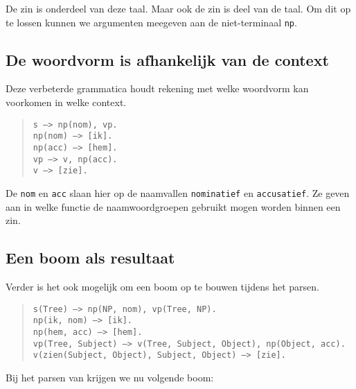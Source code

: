 De zin  is onderdeel van deze taal. Maar ook de zin  is deel van de taal. Om dit op te lossen kunnen we argumenten meegeven aan de niet-terminaal \texttt{np}.

\subsection{De woordvorm is afhankelijk van de context}
\begin{ex}
  \label{ex:nom-acc-features}
  Deze verbeterde grammatica houdt rekening met welke woordvorm kan voorkomen in welke context.
  \begin{quote}
    \texttt{s ---> np(nom), vp.} \\
    \texttt{np(nom) ---> [ik].} \\
    \texttt{np(acc) ---> [hem].} \\
    \texttt{vp ---> v, np(acc).} \\
    \texttt{v ---> [zie].} \\
  \end{quote}
\end{ex} 

De \texttt{nom} en \texttt{acc} slaan hier op de naamvallen \texttt{nominatief} en \texttt{accusatief}. Ze geven aan in welke functie de naamwoordgroepen gebruikt mogen worden binnen een zin.

\subsection{Een boom als resultaat}
\begin{ex} Verder is het ook mogelijk om een boom op te bouwen tijdens het parsen.
  \begin{quote}
    \texttt{s(Tree) ---> np(NP, nom), vp(Tree, NP).} \\
    \texttt{np(ik, nom) ---> [ik].} \\
    \texttt{np(hem, acc) ---> [hem].} \\
    \texttt{vp(Tree, Subject) ---> v(Tree, Subject, Object), np(Object, acc).} \\
    \texttt{v(zien(Subject, Object), Subject, Object) ---> [zie].}
  \end{quote}
\end{ex} 

Bij het parsen van  krijgen we nu volgende boom:


